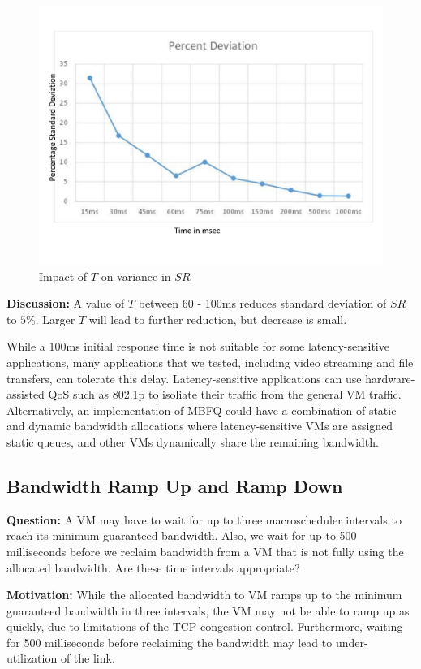 \begin{figure}
\centering
\includegraphics[width=0.7\columnwidth, trim=60pt 20mm 0pt 8mm]{figures/variation}
\caption{Impact of $T$ on variance in $SR$}
\label{variation}
\vspace{-3mm}
\end{figure}

{\bf Discussion:} A value of $T$ between 60 - 100ms reduces standard deviation
of $SR$ to $5\%$.  Larger $T$ will lead to further reduction, but decrease is
small.

While a 100ms initial response time is not suitable for some latency-sensitive applications,
many applications that we tested, including video streaming and file transfers, can tolerate
this delay. Latency-sensitive applications can use hardware-assisted QoS such as 802.1p
to isoliate their traffic from the general VM traffic.  Alternatively, an implementation of MBFQ
could have a combination of static and dynamic bandwidth allocations where latency-sensitive
VMs are assigned static queues, and other VMs dynamically share the remaining bandwidth.

\subsection{Bandwidth Ramp Up and Ramp Down}
\label{sec:fairshare}
{\bf Question:} A VM may have to wait for up to three macroscheduler intervals to reach its
minimum guaranteed bandwidth. Also, we wait for up to 500 milliseconds before we
reclaim bandwidth from a VM that is not fully using the allocated bandwidth. Are
these time intervals appropriate?

{\bf Motivation:}  While the allocated bandwidth to VM ramps up to the minimum
guaranteed bandwidth in three intervals, the VM may not be able to ramp up as
quickly, due to limitations of the TCP congestion control. Furthermore, waiting
for 500 milliseconds before reclaiming the bandwidth may lead to
under-utilization of the link.

